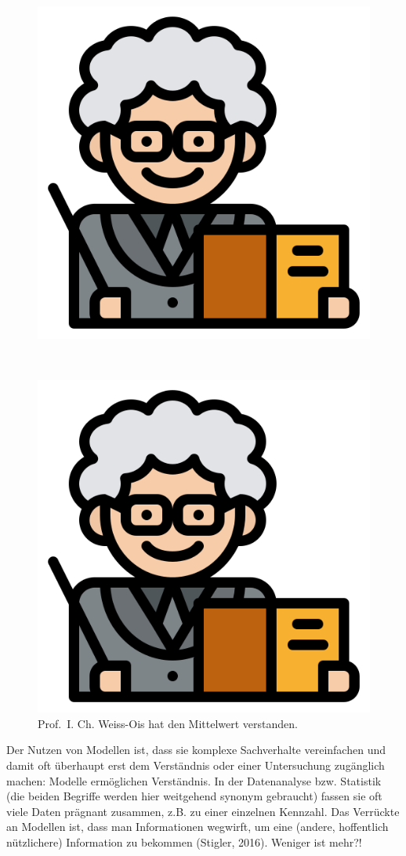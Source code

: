 \documentclass[
  letterpaper,
]{scrbook}
\theoremstyle{definition}
\theoremstyle{definition}
\theoremstyle{definition}
\theoremstyle{remark}
\begin{document}
\begin{figure}

\begin{minipage}{0.46\linewidth}

\includegraphics[width=0.25\linewidth,height=\textheight,keepaspectratio]{img/teacher.png}

\end{minipage}%
%
\begin{minipage}{0.09\linewidth}
~\end{minipage}%
%
\begin{minipage}{0.46\linewidth}

\includegraphics[width=0.25\linewidth,height=\textheight,keepaspectratio]{img/teacher.png}

\end{minipage}%

\caption{\label{fig-prof}Prof.~I. Ch. Weiss-Ois hat den Mittelwert
verstanden.}

\end{figure}%

Der Nutzen von Modellen ist, dass sie komplexe Sachverhalte vereinfachen
und damit oft überhaupt erst dem Verständnis oder einer Untersuchung
zugänglich machen: Modelle ermöglichen Verständnis. In der Datenanalyse
bzw. Statistik (die beiden Begriffe werden hier weitgehend synonym
gebraucht) fassen sie oft viele Daten prägnant zusammen, z.B. zu einer
einzelnen Kennzahl. Das Verrückte an Modellen ist, dass man
Informationen wegwirft, um eine (andere, hoffentlich nützlichere)
Information zu bekommen (Stigler, 2016). Weniger ist mehr?!
\end{document}
